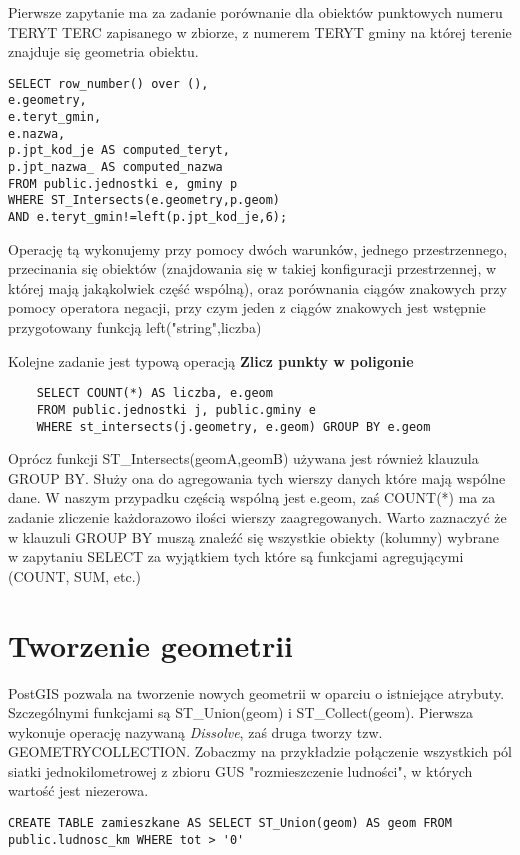 Pierwsze zapytanie ma za zadanie porównanie dla obiektów punktowych numeru TERYT TERC zapisanego w zbiorze, z numerem TERYT gminy na której terenie znajduje się geometria obiektu.

\begin{lstlisting}
SELECT row_number() over (),
e.geometry,
e.teryt_gmin,
e.nazwa,
p.jpt_kod_je AS computed_teryt,
p.jpt_nazwa_ AS computed_nazwa 
FROM public.jednostki e, gminy p
WHERE ST_Intersects(e.geometry,p.geom) 
AND e.teryt_gmin!=left(p.jpt_kod_je,6);
\end{lstlisting}
Operację tą wykonujemy przy pomocy dwóch warunków, jednego przestrzennego, przecinania się obiektów (znajdowania się w takiej konfiguracji przestrzennej, w której mają jakąkolwiek część wspólną), oraz porównania ciągów znakowych przy pomocy operatora negacji, przy czym jeden z ciągów znakowych jest wstępnie przygotowany funkcją left("string",liczba)

Kolejne zadanie jest typową operacją \textbf{Zlicz punkty w poligonie}

\begin{lstlisting}
	SELECT COUNT(*) AS liczba, e.geom 
	FROM public.jednostki j, public.gminy e 
	WHERE st_intersects(j.geometry, e.geom) GROUP BY e.geom
\end{lstlisting}
Oprócz funkcji ST\_Intersects(geomA,geomB) używana jest również klauzula GROUP BY. Służy ona do agregowania tych wierszy danych które mają wspólne dane. W naszym przypadku częścią wspólną jest e.geom, zaś COUNT(*) ma za zadanie zliczenie każdorazowo ilości wierszy zaagregowanych. Warto zaznaczyć że w klauzuli GROUP BY muszą znaleźć się wszystkie obiekty (kolumny) wybrane w zapytaniu SELECT za wyjątkiem tych które są funkcjami agregującymi (COUNT, SUM, etc.)

\section{Tworzenie geometrii}
PostGIS pozwala na tworzenie nowych geometrii w oparciu o istniejące atrybuty. Szczególnymi funkcjami są ST\_Union(geom) i ST\_Collect(geom). Pierwsza wykonuje operację nazywaną \textit{Dissolve}, zaś druga tworzy tzw. GEOMETRYCOLLECTION. Zobaczmy na przykładzie połączenie wszystkich pól siatki jednokilometrowej z zbioru GUS "rozmieszczenie ludności", w których wartość jest niezerowa. 
\begin{lstlisting}
CREATE TABLE zamieszkane AS SELECT ST_Union(geom) AS geom FROM public.ludnosc_km WHERE tot > '0'
\end{lstlisting}

